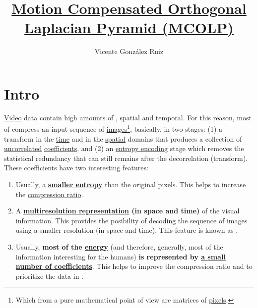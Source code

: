 \title{\href{https://github.com/Sistemas-Multimedia/MCOLP}{Motion Compensated Orthogonal Laplacian Pyramid (MCOLP)}}
\author{Vicente González Ruiz}
\maketitle
\tableofcontents

\section{Intro}

\href{https://en.wikipedia.org/wiki/Video}{Video} data contain high
amounts of , spatial and temporal. For
this reason, most of 
compress an input sequence of
\href{https://en.wikipedia.org/wiki/Digital_image}{images}\footnote{Which
  from a pure mathematical point of view are matrices of
  \href{https://en.wikipedia.org/wiki/Pixel}{pixels}.}, basically, in
two stages: (1) a transform in the
\href{https://en.wikipedia.org/wiki/Time_domain}{time} and in the
\href{https://www.quora.com/What-is-spatial-domain-in-image-processing}{spatial}
domains that produces a collection of
\href{https://en.wikipedia.org/wiki/Decorrelation}{uncorrelated}
\href{https://en.wikipedia.org/wiki/Discrete_wavelet_transform}{coefficients},
and (2) an
\href{https://en.wikipedia.org/wiki/Entropy_encoding}{entropy
  encoding} stage which removes the statistical redundancy that can
still remains after the decorrelation (transform). These coefficients
have two interesting features:
\begin{enumerate}
\item Usually, a \textbf{
  \href{https://vicente-gonzalez-ruiz.github.io/symbol_compression/}{smaller
  entropy}} than the original pixels. This helps to increase
  the \href{https://en.wikipedia.org/wiki/Data_compression_ratio}{compression
    ratio}.
\item A
  \textbf{\href{https://en.wikipedia.org/wiki/Image_resolution}{multiresolution
      representation} (in space and time)} of the visual
  information. This provides the posibility of decoding the sequence
  of images using a smaller resolution (in space and time). This
  feature is known as .
\item Usually, \textbf{most of the
  \href{https://en.wikipedia.org/wiki/Energy_(signal_processing)}{energy}}
  (and therefore, generally, most of the information interesting for
  the humans) \textbf{is represented by
    \href{https://vicente-gonzalez-ruiz.github.io/image_transformations_for_coding}{a
      small number of coefficients}}. This helps to improve the
  compression ratio and to prioritize the data in
  .
\end{enumerate}

